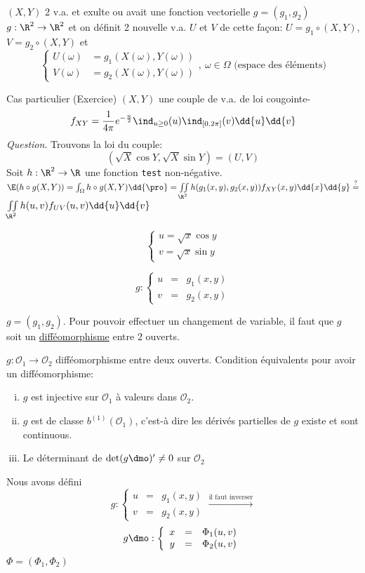$(X,Y)$ 2 v.a. et exulte ou avait une fonction vectorielle $g=(g_1,g_2)$ $g:\R^2\rightarrow\R^2$ et on définit 2 nouvelle v.a. $U$ et $V$ de cette façon:
$U=g_1\circ (X,Y)$, $V=g_2\circ (X,Y)$ et
$$\left\{\begin{array}{ccc}U(\omega)&=g_1(X(\omega),Y(\omega))\\V(\omega)&=g_2(X(\omega),Y(\omega))\end{array}\right.,\ \omega\in\Omega\text{ (espace des éléments)}$$

Cas particulier (Exercice)
$(X,Y)$ une couple de v.a. de loi  cougointe-
$$f_{XY}=\frac1{4\pi}e^{-\frac u2}\ind_{u\geq 0}(u)\ind_{[0,2\pi]}(v)\dd{u}\dd{v}$$\emph{
Question}. Trouvons la loi du couple:
$$(\sqrt{X}\cos Y, \sqrt X\sin Y)=(U,V)$$
Soit $h:\R^2\rightarrow \R$ une fonction \texttt{test} non-négative.
$\E(h\circ g(X,Y))=\int_\Omega h\circ g(X,Y)\dd{\pro}=\iint\limits_{\R^2}h(g_1(x,y), g_2(x,y))f_{XY}(x,y)\dd{x} \dd{y}\overset{?}{=}$ $\iint\limits_{\R^2}h(u,v)f_{UV}(u,v)\dd{u} \dd{v}$

$$\left\{\begin{array}{ccc}u=\sqrt x \cos y\\ v=\sqrt x \sin y\end{array}\right.$$

$$g: \left\{ \begin{array}{ccc}u&=&g_1(x,y)\\v&=&g_2(x,y)\end{array} \right.$$

$g=(g_1,g_2)$. Pour pouvoir effectuer un changement de variable, il faut que $g$ soit un \underline{difféomorphisme} entre 2 ouverts.

$g:\mathcal O_1\rightarrow \mathcal O_2$ difféomorphisme entre deux ouverts. Condition équivalents pour avoir un difféomorphisme:
\begin{enumerate}[(i)]
	\item $g$ est injective sur $\mathcal O_1$ à valeurs dans $\mathcal O_2$.
	\item $g$ est de classe $b^{(1)}(\mathcal O_1)$, c'est-à dire les dérivés partielles de $g$ existe et sont continuous.
	\item Le déterminant de $\det(g\dmo)'\neq 0$ sur $\mathcal O_2$
\end{enumerate}

Nous avons défini
$$g: \left\{ \begin{array}{ccc}u&=&g_1(x,y)\\v&=&g_2(x,y)\end{array} \right.\overset{\mbox{il faut inverser}}{\rightarrow}$$
$$g\dmo: \left\{ \begin{array}{ccc}x&=&\Phi_1(u,v)\\y&=&\Phi_2(u,v)\end{array} \right.$$
$\Phi=(\Phi_1,\Phi_2)$

